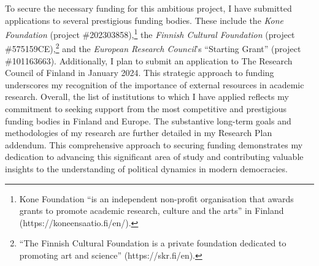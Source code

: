 \documentclass[10pt,stdletter,dateno,sigleft]{newlfm} %
\begin{document}
\begin{newlfm}
To secure the necessary funding for this ambitious project, I have submitted applications to several prestigious funding bodies. These include the \emph{Kone Foundation} (project \#202303858),\footnote{Kone Foundation ``is an independent non-profit organisation that awards grants to promote academic research, culture and the arts'' in Finland (https://koneensaatio.fi/en/).} the \emph{Finnish Cultural Foundation} (project \#575159CE),\footnote{``The Finnish Cultural Foundation is a private foundation dedicated to promoting art and science'' (https://skr.fi/en).} and the \emph{European Research Council}'s ``Starting Grant'' (project \#101163663). Additionally, I plan to submit an application to The Research Council of Finland in January 2024. This strategic approach to funding underscores my recognition of the importance of external resources in academic research. Overall, the list of institutions to which I have applied reflects my commitment to seeking support from the most competitive and prestigious funding bodies in Finland and Europe. The substantive long-term goals and methodologies of my research are further detailed in my Research Plan addendum. This comprehensive approach to securing funding demonstrates my dedication to advancing this significant area of study and contributing valuable insights to the understanding of political dynamics in modern democracies.


\end{newlfm}
\end{document}
